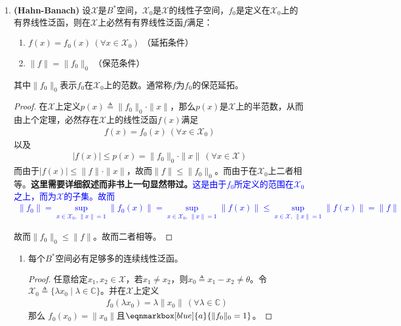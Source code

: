 \begin{enumerate}[leftmargin=2cm, label=\arabic*]
		\item \textbf{(Hahn-Banach)} 设$\mathscr{X}$是$B^*$空间，$\mathscr{X}_0$是$\mathscr{X}$的线性子空间，$f_0$是定义在$\mathscr{X}_0$上的有界线性泛函，则在$\mathscr{X}$上必然有有界线性泛函$f$满足：
		\begin{enumerate}[leftmargin=1cm, label=(\arabic*)]
			\item $f(x) = f_0(x)\ (\forall x\in\mathscr{X}_0)$ （延拓条件）
			\item $\|f\| = \|f_0\|_0$ （保范条件）
		\end{enumerate}
		其中$\|f_0\|_0$表示$f_0$在$\mathscr{X}_0$上的范数。通常称$f$为$f_0$的保范延拓。
		\begin{proof}
			在$\mathscr{X}$上定义$p(x)\triangleq \|f_0\|_0 \cdot \|x\|$，那么$p(x)$是$\mathscr{X}$上的半范数，从而由上个定理，必然存在$\mathscr{X}$上的线性泛函$f(x)$满足
			\begin{align*}
				f(x) = f_0(x) \ (\forall x\in\mathscr{X}_0)
			\end{align*}
			以及
			\begin{align*}
				|f(x)| \leqslant p(x) = \|f_0\|_0 \cdot \|x\| \ (\forall x\in\mathscr{X})
			\end{align*}
			而由于$|f(x)|\leqslant \|f\|\cdot \|x\|$，故而$\|f\|\leqslant \|f_0\|_0$。而由于在$\mathscr{X}_0$上二者相等。\textbf{这里需要详细叙述而非书上一句显然带过。}\textcolor{blue}{这是由于$f_0$所定义的范围在$\mathscr{X}_0$之上，而为$\mathscr{X}$的子集。故而}
			\textcolor{blue}{\begin{align*}
					\|f_0\| = \sup\limits_{x\in\mathscr{X}_0,\ \|x\| = 1} \|f_0(x)\| = \sup\limits_{x\in\mathscr{X}_0,\ \|x\| = 1} \|f(x)\| \leqslant \sup\limits_{x\in\mathscr{X},\ \|x\|=1} \|f(x)\| = \|f\|
			\end{align*}}
			
			故而$\|f_0\|_0\leqslant \|f\|$。故而二者相等。
		\end{proof}
		
		\begin{enumerate}[leftmargin=1cm, label=(\arabic*)]
			\item 每个$B^*$空间必有足够多的连续线性泛函。
			\begin{proof}
				任意给定$x_1,x_2\in\mathscr{X}$，若$x_1\neq x_2$，则$x_0\triangleq x_1-x_2\neq \theta$。令$\mathscr{X}_0\triangleq \{\lambda x_0\mid \lambda\in\mathbb{C}\}$。并在$\mathscr{X}$上定义
				\begin{align*}
					f_0(\lambda x_0) = \lambda\|x_0\| \ (\forall\lambda\in\mathbb{C})
				\end{align*}
				那么 $f_0(x_0) = \|x_0\|$且$\eqnmarkbox[blue]{a}{\|f_0\|_0= 1}$。
				

\end{proof}
\end{enumerate}
\end{enumerate}
